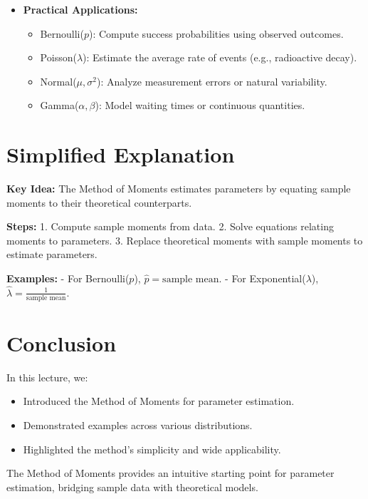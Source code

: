 \documentclass{article}
\begin{document}
\begin{itemize}
  \item \textbf{Practical Applications:}
    \begin{itemize}
      \item Bernoulli($p$): Compute success probabilities using observed outcomes.
      \item Poisson($\lambda$): Estimate the average rate of events (e.g., radioactive decay).
      \item Normal($\mu, \sigma^2$): Analyze measurement errors or natural variability.
      \item Gamma($\alpha, \beta$): Model waiting times or continuous quantities.
    \end{itemize}
\end{itemize}

\section*{Simplified Explanation}

\textbf{Key Idea:}
The Method of Moments estimates parameters by equating sample moments to their theoretical counterparts.

\textbf{Steps:}
1. Compute sample moments from data.
2. Solve equations relating moments to parameters.
3. Replace theoretical moments with sample moments to estimate parameters.

\textbf{Examples:}
- For Bernoulli($p$), $\hat{p} = \text{sample mean}$.
- For Exponential($\lambda$), $\hat{\lambda} = \frac{1}{\text{sample mean}}$.

\section*{Conclusion}

In this lecture, we:
\begin{itemize}
  \item Introduced the Method of Moments for parameter estimation.
  \item Demonstrated examples across various distributions.
  \item Highlighted the method's simplicity and wide applicability.
\end{itemize}

The Method of Moments provides an intuitive starting point for parameter estimation, bridging sample data with theoretical models.
\end{document}

